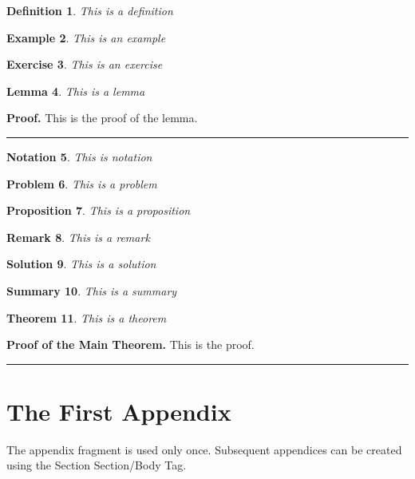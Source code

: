\documentclass{article}
\newtheorem{theorem}{Theorem}
\newtheorem{definition}[theorem]{Definition}
\newtheorem{example}[theorem]{Example}
\newtheorem{exercise}[theorem]{Exercise}
\newtheorem{lemma}[theorem]{Lemma}
\newtheorem{notation}[theorem]{Notation}
\newtheorem{problem}[theorem]{Problem}
\newtheorem{proposition}[theorem]{Proposition}
\newtheorem{remark}[theorem]{Remark}
\newtheorem{solution}[theorem]{Solution}
\newtheorem{summary}[theorem]{Summary}
\newenvironment{proof}[1][Proof]{\textbf{#1.} }{\ \rule{0.5em}{0.5em}}
\begin{document}
\begin{definition}
This is a definition
\end{definition}

\begin{example}
This is an example
\end{example}

\begin{exercise}
This is an exercise
\end{exercise}

\begin{lemma}
This is a lemma
\end{lemma}

\begin{proof}
This is the proof of the lemma.
\end{proof}

\begin{notation}
This is notation
\end{notation}

\begin{problem}
This is a problem
\end{problem}

\begin{proposition}
This is a proposition
\end{proposition}

\begin{remark}
This is a remark
\end{remark}

\begin{solution}
This is a solution
\end{solution}

\begin{summary}
This is a summary
\end{summary}

\begin{theorem}
This is a theorem
\end{theorem}

\begin{proof}[Proof of the Main Theorem]
This is the proof.
\end{proof}

\appendix

\section{The First Appendix}

The appendix fragment is used only once. Subsequent appendices can be
created using the Section Section/Body Tag.
\end{document}
